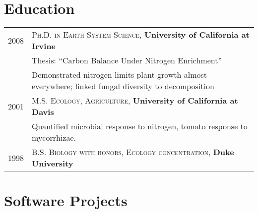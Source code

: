 \documentclass[a4paper,10pt]{article}
\begin{document}
\section{Education}
\begin{tabular}{rp{11cm}}	
2008 & \textsc{Ph.D. in Earth System Science}, \textbf{University of California at Irvine}\\
& \small Thesis: ``Carbon Balance Under Nitrogen Enrichment''\\
&\small Demonstrated nitrogen limits plant growth almost everywhere; linked fungal diversity to decomposition\\
 2001 & \textsc{M.S. Ecology, Agriculture}, \textbf{University of California at Davis} \\
 &\small Quantified microbial response to nitrogen, tomato response to mycorrhizae.\\
1998 & \textsc{B.S. Biology with honors, Ecology concentration}, \textbf{Duke University} \\
\end{tabular}

\section{Software Projects}
\end{document}

